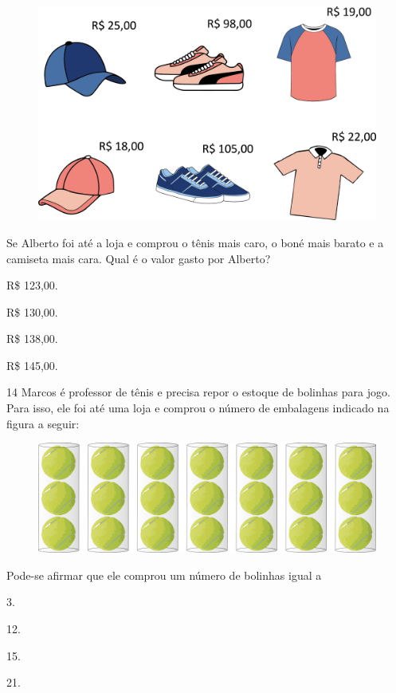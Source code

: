 \begin{figure}[htpb!]
\centering
\includegraphics[width=\textwidth]{./media/image120.png}
\end{figure}

Se Alberto foi até a loja e comprou o tênis mais caro, o boné mais barato e a camiseta mais cara. Qual é o valor gasto por Alberto?

\begin{escolha}
\item
  R\$ 123,00.
\item
  R\$ 130,00.
\item
  R\$ 138,00.
\item
  R\$ 145,00.
\end{escolha}


\pagebreak
\num{14} Marcos é professor de tênis e  precisa repor o estoque de bolinhas para jogo. Para isso, ele foi até uma loja e comprou o número de embalagens indicado na figura a seguir:

\begin{figure}[htpb!]
\centering
\includegraphics[width=.8\textwidth]{./media/image121.png}
\end{figure}

Pode-se afirmar que ele comprou um número de bolinhas igual a

\begin{multicols}{2}
\begin{escolha}
\item
  3.
\item
  12.
\item
  15.
\item
  21.
\end{escolha}
\end{multicols}


